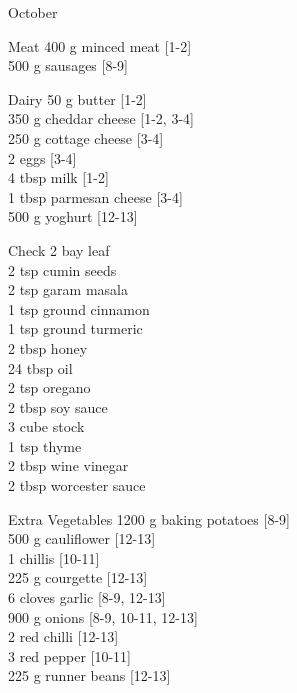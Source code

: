 \begin{menu}{October}
      \begin{shoppinglist}{Meat}
      400 g minced meat {\scriptsize[1-2]}\\
      500 g sausages {\scriptsize[8-9]}\\
      \end{shoppinglist}%
      \begin{shoppinglist}{Dairy}
      50 g butter {\scriptsize[1-2]}\\
      350 g cheddar cheese {\scriptsize[1-2, 3-4]}\\
      250 g cottage cheese {\scriptsize[3-4]}\\
      2  eggs {\scriptsize[3-4]}\\
      4 tbsp milk {\scriptsize[1-2]}\\
      1 tbsp parmesan cheese {\scriptsize[3-4]}\\
      500 g yoghurt {\scriptsize[12-13]}\\
      \end{shoppinglist}%
      \par\vfil %
      \vfil\clearpage %
      \begin{shoppinglist}{Check}
      2  bay leaf \\
      2 tsp cumin seeds \\
      2 tsp garam masala \\
      1 tsp ground cinnamon \\
      1 tsp ground turmeric \\
      2 tbsp honey \\
      24 tbsp oil \\
      2 tsp oregano \\
      2 tbsp soy sauce \\
      3 cube stock \\
      1 tsp thyme \\
      2 tbsp wine vinegar \\
      2 tbsp worcester sauce \\
      \end{shoppinglist}%
      \begin{shoppinglist}{Extra Vegetables}
      1200 g baking potatoes {\scriptsize[8-9]}\\
      500 g cauliflower {\scriptsize[12-13]}\\
      1  chillis {\scriptsize[10-11]}\\
      225 g courgette {\scriptsize[12-13]}\\
      6 cloves garlic {\scriptsize[8-9, 12-13]}\\
      900 g onions {\scriptsize[8-9, 10-11, 12-13]}\\
      2  red chilli {\scriptsize[12-13]}\\
      3  red pepper {\scriptsize[10-11]}\\
      225 g runner beans {\scriptsize[12-13]}\\
      \end{shoppinglist}%
      \par\vfil %
    \vfil\clearpage
  

\end{menu}
